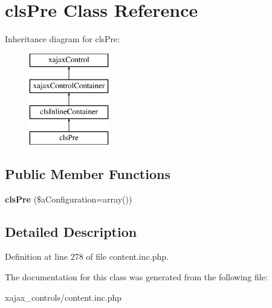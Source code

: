 \hypertarget{classclsPre}{
\section{clsPre Class Reference}
\label{classclsPre}
}
Inheritance diagram for clsPre:\begin{figure}[H]
\begin{center}
\leavevmode
\includegraphics[height=4.000000cm]{classclsPre}
\end{center}
\end{figure}
\subsection*{Public Member Functions}
\begin{DoxyCompactItemize}
\item 
\hypertarget{classclsPre_a799bdf5023afeb722b83571cf5471a56}{
{\bfseries clsPre} (\$aConfiguration=array())}
\label{classclsPre_a799bdf5023afeb722b83571cf5471a56}

\end{DoxyCompactItemize}


\subsection{Detailed Description}


Definition at line 278 of file content.inc.php.



The documentation for this class was generated from the following file:\begin{DoxyCompactItemize}
\item 
xajax\_\-controls/content.inc.php\end{DoxyCompactItemize}
